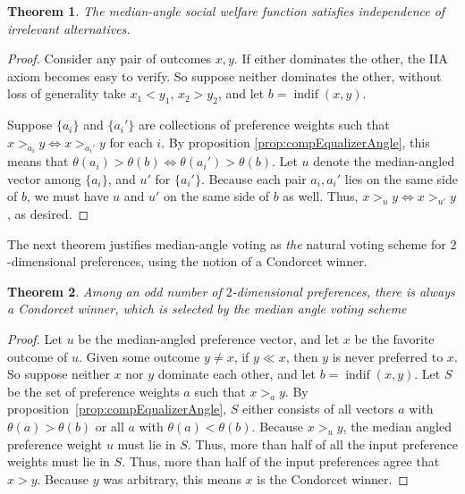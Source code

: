 \documentclass[12pt]{article}
\newtheorem{theorem}{Theorem}
\DeclareMathOperator*{\indif}{indif}
\newcommand{\1}[1]{\mathds{1}[{#1}]}
\begin{document}
  \begin{theorem}\label{thrm:2DIIA}
    The median-angle social welfare function satisfies independence of irrelevant
    alternatives.
  \end{theorem}
  \begin{proof}
    Consider any pair of outcomes $x,y$. If either dominates the other, the
    IIA axiom becomes easy to verify.
    So suppose neither dominates the other, without loss of generality take
    $x_1 < y_1$, $x_2 > y_2$, and let $b = \indif(x,y)$.

    Suppose $\{a_i\}$ and $\{a_i'\}$ are collections of preference weights such
    that $x>_{a_i} y \iff x>_{a_i'} y$ for each $i$.
    By proposition \ref{prop:compEqualizerAngle},
    this means that $\theta(a_i) > \theta(b) \iff \theta(a_i') > \theta(b)$.
    Let $u$ denote the median-angled vector among $\{a_i\}$,
    and $u'$ for $\{a_i'\}$.
    Because each pair $a_i, a_i'$ lies on the same side of $b$,
    we must have $u$ and $u'$ on the same side of $b$ as well.
    Thus, $x >_u y \iff x >_{u'} y$, as desired.
  \end{proof}

  The next theorem justifies median-angle voting as \emph{the} natural
  voting scheme for $2$-dimensional preferences, using the notion of a Condorcet
  winner.
  \begin{theorem}\label{thrm:2DCondorcet}
    Among an odd number of $2$-dimensional preferences,
    there is always a Condorcet winner, which is selected
    by the median angle voting scheme
  \end{theorem}
  \begin{proof}
    Let $u$ be the median-angled preference vector, and let
    $x$ be the favorite outcome of $u$.
    Given some outcome $y\ne x$, if $y \ll x$, then
    $y$ is never preferred to $x$.
    So suppose neither $x$ nor $y$ dominate each other, and let
    $b = \indif(x,y)$.
    Let $S$ be the set of preference weights $a$ such that $x>_a y$.
    By proposition~\ref{prop:compEqualizerAngle}, $S$ either consists of all vectors
    $a$ with $\theta(a) > \theta(b)$ or all $a$ with $\theta(a) < \theta(b)$.
    Because $x >_u y$,
    the median angled preference weight $u$ must lie in $S$.
    Thus, more than half of all the input preference weights must lie in $S$.
    Thus, more than half of the input preferences agree that $x > y$.
    Because $y$ was arbitrary, this means $x$ is the Condorcet winner.
  \end{proof}
\end{document}
